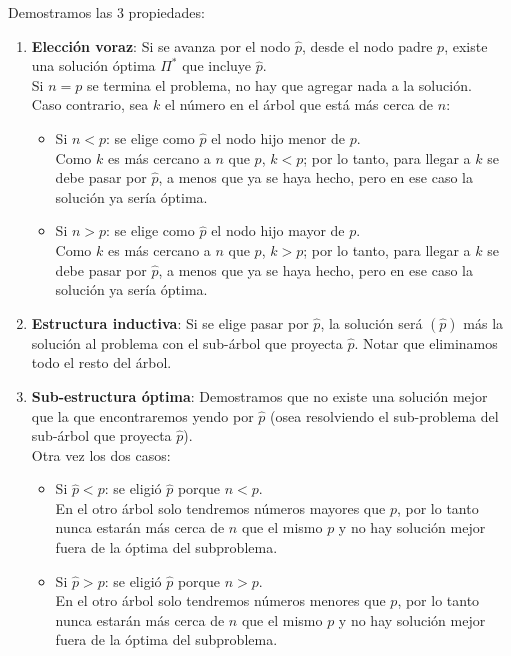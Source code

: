 \documentclass[spanish, fleqn]{article}
\begin{document}
\begin{enumerate}
Demostramos las 3 propiedades:
\begin{enumerate}
\item \textbf{Elección voraz}: Si se avanza por el nodo $\hat{p}$, desde el nodo padre $p$, existe una solución óptima $\Pi^*$ que incluye $\hat{p}$.
\\ Si $n=p$ se termina el problema, no hay que agregar nada a la solución. 
\\ Caso contrario, sea $k$ el número en el árbol que está más cerca de $n$:
\begin{itemize}
\item Si $n<p$: se elige como $\hat{p}$ el nodo hijo menor de $p$.\\ Como $k$ es más cercano a $n$ que $p$, $k<p$; por lo tanto, para llegar a $k$ se debe pasar por $\hat{p}$, a menos que ya se haya hecho, pero en ese caso la solución ya sería óptima.
\item Si $n>p$: se elige como $\hat{p}$ el nodo hijo mayor de $p$.\\ Como $k$ es más cercano a $n$ que $p$, $k>p$; por lo tanto, para llegar a $k$ se debe pasar por $\hat{p}$, a menos que ya se haya hecho, pero en ese caso la solución ya sería óptima.
\end{itemize}
\item \textbf{Estructura inductiva}: Si se elige pasar por $\hat{p}$, la solución será $(\hat{p})$ más la solución al problema con el sub-árbol que proyecta $\hat{p}$. Notar que eliminamos todo el resto del árbol.
\item \textbf{Sub-estructura óptima}: Demostramos que no existe una solución mejor que la que encontraremos yendo por $\hat{p}$ (osea resolviendo el sub-problema del sub-árbol que proyecta $\hat{p}$).
\\ Otra vez los dos casos:
\begin{itemize}
\item Si $\hat{p}<p$: se eligió $\hat{p}$ porque $n<p$.
\\ En el otro árbol solo tendremos números mayores que $p$, por lo tanto nunca estarán más cerca de $n$ que el mismo $p$ y no hay solución mejor fuera de la óptima del subproblema.
\item Si $\hat{p}>p$: se eligió $\hat{p}$ porque $n>p$.
\\ En el otro árbol solo tendremos números menores que $p$, por lo tanto nunca estarán más cerca de $n$ que el mismo $p$ y no hay solución mejor fuera de la óptima del subproblema.
\end{itemize}


\end{enumerate}
\end{enumerate}
\end{document}
